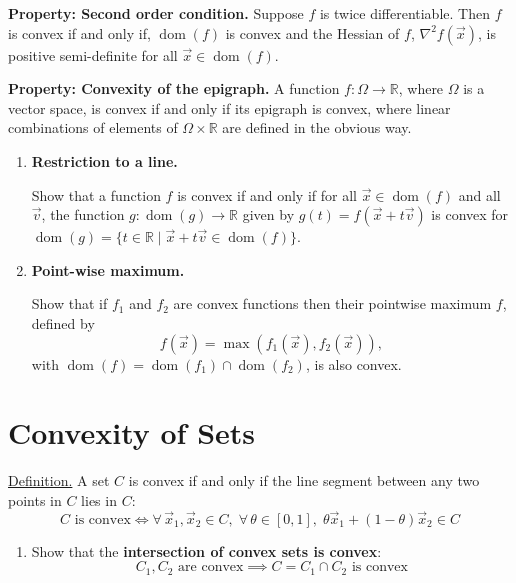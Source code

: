\documentclass[10pt]{article}
\newcommand{\RR}{\mathbb{R}}
\DeclareMathOperator{\dom}{dom}
\begin{document}
\textbf{Property: Second order condition.} Suppose $f$ is twice differentiable. Then $f$ is convex if and only if, $\dom(f)$ is convex and the Hessian of $f$, $\nabla^2 f(\vec{x})$, is positive semi-definite for all $\vec{x} \in \dom(f)$.

\textbf{Property: Convexity of the epigraph.} A function $f\colon \Omega \to \RR$, where $\Omega$ is a vector space, is convex if and only if its epigraph is convex, where linear combinations of elements of $\Omega \times \RR$ are defined in the obvious way.

\begin{enumerate}[label=(\alph*)]
    \item \textbf{Restriction to a line.}

    Show that a function $f$ is convex if and only if for all $\vec{x} \in \dom(f)$ and all $\vec{v}$, the function $g\colon \dom(g) \to \RR$ given by $g(t) = f(\vec{x} + t\vec{v})$ is convex for $\dom(g) = \{t \in \RR \mid \vec{x} + t\vec{v} \in \dom(f)\}$.

    \item \textbf{Point-wise maximum.}

    Show that if $f_1$ and $f_2$ are convex functions then their pointwise maximum $f$, defined by
    \begin{equation}
        f(\vec{x}) = \max(f_1(\vec{x}), f_2(\vec{x})),
    \end{equation}
    with $\dom(f) = \dom(f_1) \cap \dom(f_2)$, is also convex.
\end{enumerate}

\section{Convexity of Sets}

\underline{Definition.} A set $C$ is convex if and only if the line segment between any two points in $C$ lies in $C$:
\begin{equation}
    C \text{ is convex} \iff \forall\, \vec{x}_1, \vec{x}_2 \in C,\; \forall\, \theta \in [0,1],\; \theta \vec{x}_1 + (1-\theta)\vec{x}_2 \in C
\end{equation}

\begin{enumerate}[label=(\alph*)]
    \item Show that the \textbf{intersection of convex sets is convex}:
    \begin{equation}
        C_1, C_2 \text{ are convex} \implies C = C_1 \cap C_2 \text{ is convex}
    \end{equation}
\end{enumerate}
\end{document}
